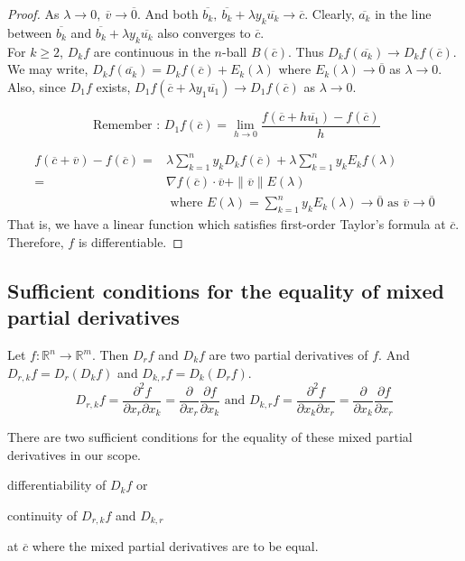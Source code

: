 \begin{proof}
	As $\lambda{} \to 0,\ \overline{v} \to \overline{0}$.
	And both $\overline{b_k},\ \overline{b_k}+\lambda{}y_k\overline{u_k} \to \overline{c}$.
	Clearly, $\overline{a_k}$ in the line between $\overline{b_k}$ and $\overline{b_k}+\lambda{} y_k \overline{u_k}$ also converges to $\overline{c}$.\\
	
	For $k \ge 2$, $D_kf$ are continuous in the $n$-ball $B(\overline{c})$.
	Thus $D_kf(\overline{a_k}) \to D_kf(\overline{c})$.
	We may write, $D_kf(\overline{a_k}) = D_kf(\overline{c}) + E_k(\lambda)$ where $E_k(\lambda) \to \overline{0}$ as $\lambda{} \to 0$.
	Also, since $D_1 f$ exists, $D_1f(\overline{c}+\lambda{} y_1\overline{u_1}) \to D_1f(\overline{c})$ as $\lambda{} \to 0$.
	\begin{commentary} \[ \text{ Remember : } D_1 f(\overline{c}) = \lim_{h \to 0} \frac{f(\overline{c}+h\overline{u_1}) - f(\overline{c})}{h} \] \end{commentary}
	\begin{align*}
		f(\overline{c}+\overline{v}) - f(\overline{c}) = & \lambda{} \sum_{k = 1}^n y_kD_kf(\overline{c}) + \lambda{} \sum_{k = 1}^n y_kE_kf(\lambda{})\\
		= & \nabla f(\overline{c}) \cdot \overline{v} + \|\overline{v}\|E(\lambda) \\
		& \text{ where } E(\lambda{}) = \sum_{k = 1}^n y_k E_k(\lambda{}) \to \overline{0} \text{ as } \overline{v} \to \overline{0}
	\end{align*}
	That is, we have a linear function which satisfies first-order Taylor's formula at $\overline{c}$.
	Therefore, $f$ is differentiable.
\end{proof}

\subsection{Sufficient conditions for the equality of mixed partial derivatives}
Let $f : \mathbb{R}^n \to \mathbb{R}^m$.
Then $D_r f$ and $D_k f$ are two partial derivatives of $f$.
And $D_{r,k} f = D_r(D_k f)$ and $D_{k,r} f = D_k (D_r f)$.
\[ D_{r,k} f = \frac{\partial^2 f}{\partial x_r \partial x_k} = \frac{\partial}{\partial x_r} \frac{\partial f}{\partial x_k} \text{ and } D_{k,r} f = \frac{\partial^2 f}{\partial x_k \partial x_r} = \frac{\partial}{\partial x_k} \frac{\partial f}{\partial x_r}  \]
\begin{commentary}There are two sufficient conditions for the equality of these mixed partial derivatives in our scope.
\begin{enumerate*} \item differentiability of $D_k f$ or \item continuity of $D_{r,k} f$ and $D_{k,r}$ \end{enumerate*} at $\overline{c}$ where the mixed partial derivatives are to be equal.\end{commentary}
